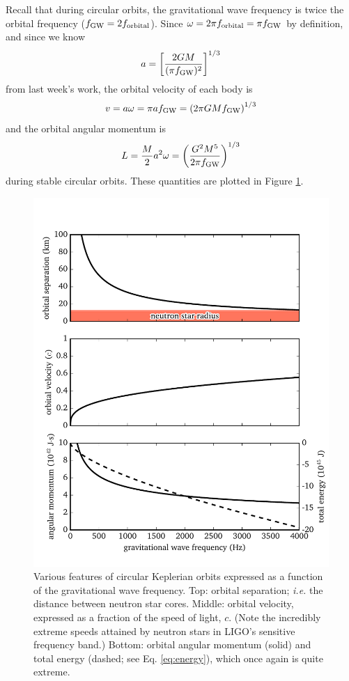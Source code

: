 \documentclass[11pt]{article}
\begin{document}
\begin{enumerate}
\hspace{15pt} Recall that during circular orbits, the gravitational wave frequency is twice the orbital frequency ($f_{\rm GW} = 2f_{\rm orbital}$). Since $\omega = 2\pi f_{\rm orbital} = \pi f_{\rm GW}$ by definition, and since we know
\begin{equation}
a = \left[ \frac{2GM}{(\pi f_{\rm GW})^2} \right]^{1/3}
\end{equation}
from last week's work, the orbital velocity of each body is
\begin{equation}
v = a\omega = \pi a f_{\rm GW} = \left( 2\pi GMf_{\rm GW} \right)^{1/3}
\end{equation}
and the orbital angular momentum is
\begin{equation}
L = \frac{M}{2} a^2 \omega = \left( \frac{G^2M^{5}}{2\pi f_{\rm GW}} \right)^{1/3}
\end{equation}
during stable circular orbits. These quantities are plotted in Figure \ref{fig:L}.

\begin{figure}
\centering
\includegraphics[scale=1]{keplerian_orbit/kepler_angular_momentum.pdf}
\caption{\label{fig:L} Various features of circular Keplerian orbits expressed as a function of the gravitational wave frequency. Top: orbital separation; \textit{i.e.} the distance between neutron star cores. Middle: orbital velocity, expressed as a fraction of the speed of light, $c$. (Note the incredibly extreme speeds attained by neutron stars in LIGO's sensitive frequency band.) Bottom: orbital angular momentum (solid) and total energy (dashed; see Eq. \ref{eq:energy}), which once again is quite extreme.}
\end{figure}


\end{enumerate}
\end{document}
